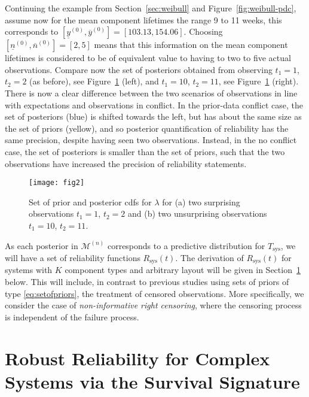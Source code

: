 \documentclass[Journal,letterpaper]{ascelike-new}
\newcommand{\uz}{^{(0)}} %
\newcommand{\un}{^{(n)}} %
\newcommand{\ul}[1]{\underline{#1}}
\newcommand{\ol}[1]{\overline{#1}}
\newcommand{\Rsys}{R_\text{sys}}
\def\Rsys{R_\text{sys}}
\def\Tsys{T_\text{sys}}
\def\yzl{\ul{y}\uz}
\def\yzu{\ol{y}\uz}
\def\nzl{\ul{n}\uz}
\def\nzu{\ol{n}\uz}
\def\MN{\mathcal{M}\un}
\begin{document}
Continuing the example from Section~\ref{sec:weibull} and Figure~\ref{fig:weibull-pdc},
assume now for the mean component lifetimes the range 9 to 11 weeks,
this corresponds to $[\yzl,\yzu] = [103.13, 154.06]$.
Choosing $[\nzl,\nzu] =[2, 5]$
means that this information on the mean component lifetimes is considered to be of equivalent value to having to two to five 
actual observations.
Compare now the set of posteriors obtained from observing
$t_1 = 1$, $t_2 = 2$ (as before), see Figure~\ref{fig:setofpost-pdc-nopdc} (left),
and $t_1 = 10$, $t_2 = 11$, see Figure~\ref{fig:setofpost-pdc-nopdc} (right).
There is now a clear difference between the two scenarios of
observations in line with expectations and observations in conflict.
In the prior-data conflict case, the set of posteriors (blue)
is shifted towards the left, but has about the same size as the set of priors (yellow),
and so posterior quantification of reliability has the same precision,
despite having seen two observations.
Instead, in the no conflict case, the set of posteriors is smaller than the set of priors,
such that the two observations have increased the precision of reliability statements.

\begin{figure}
\texttt{[image: fig2]}
\caption{Set of prior and posterior cdfs for $\lambda$ for (a) two surprising observations $t_1 = 1$, $t_2 = 2$
and (b) two unsurprising observations $t_1 = 10$, $t_2 = 11$.}
\label{fig:setofpost-pdc-nopdc}
\end{figure}

As each posterior in $\MN$ corresponds to a predictive distribution for $\Tsys$,
we will have a set of reliability functions $\Rsys(t)$.
The derivation of $\Rsys(t)$ for systems with $K$ component types and arbitrary layout
will be given in Section~\ref{sec:robrel} below.
This will include, in contrast to previous studies using sets of priors of type 
\eqref{eq:setofpriors}, the treatment of censored observations.
More specifically, we consider the case of \emph{non-informative right censoring},
where the censoring process is independent of the failure process.






\section{Robust Reliability for Complex Systems via the Survival Signature}
\label{sec:robrel}
\end{document}
